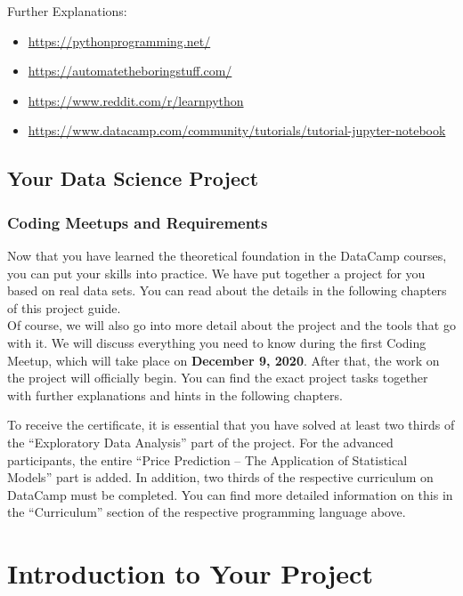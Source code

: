 \documentclass[
  11pt,
]{book}
\providecommand{\tightlist}{%
  \setlength{\itemsep}{0pt}\setlength{\parskip}{0pt}}
\begin{document}
Further Explanations:

\begin{itemize}
\tightlist
\item
  \url{https://pythonprogramming.net/}
\item
  \url{https://automatetheboringstuff.com/}
\item
  \url{https://www.reddit.com/r/learnpython}
\item
  \url{https://www.datacamp.com/community/tutorials/tutorial-jupyter-notebook}
\end{itemize}

\hypertarget{your-data-science-project}{%
\section{Your Data Science Project}\label{your-data-science-project}}

\hypertarget{coding-meetups-and-requirements}{%
\subsection{Coding Meetups and
Requirements}\label{coding-meetups-and-requirements}}

Now that you have learned the theoretical foundation in the DataCamp
courses, you can put your skills into practice. We have put together a
project for you based on real data sets. You can read about the details
in the following chapters of this project guide.\\
Of course, we will also go into more detail about the project and the
tools that go with it. We will discuss everything you need to know
during the first Coding Meetup, which will take place on
\textbf{December 9, 2020}. After that, the work on the project will
officially begin. You can find the exact project tasks together with
further explanations and hints in the following chapters.

To receive the certificate, it is essential that you have solved at
least two thirds of the ``Exploratory Data Analysis'' part of the
project. For the advanced participants, the entire ``Price Prediction --
The Application of Statistical Models'' part is added. In addition, two
thirds of the respective curriculum on DataCamp must be completed. You
can find more detailed information on this in the ``Curriculum'' section
of the respective programming language above.

\newpage

\hypertarget{introduction-to-your-project}{%
\chapter{Introduction to Your
Project}\label{introduction-to-your-project}}
\end{document}
